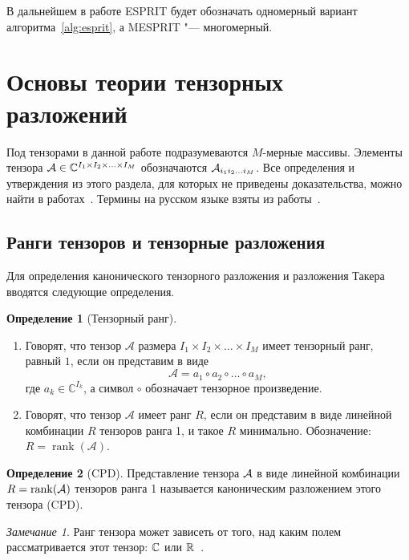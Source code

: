 \documentclass[specialist,
  substylefile = spbu.rtx,
subf,href,colorlinks=true, 12pt]{disser}
\theoremstyle{plain}
\theoremstyle{definition}
\newtheorem{definition}{Определение}[section]
\theoremstyle{remark}
\newtheorem{remark}{Замечание}[section]
\begin{document}
В дальнейшем в работе ESPRIT будет обозначать одномерный вариант
алгоритма~\ref{alg:esprit}, а MESPRIT "--- многомерный.

\section{Основы теории тензорных разложений}\label{sec:tensor-decompositions}
Под тензорами в данной работе подразумеваются $M$-мерные массивы.
Элементы тензора $\mathcal{A} \in \mathbb{C}^{I_1 \times I_2 \times \ldots \times
I_M}$ обозначаются
$\mathcal{A}_{i_1 i_2 \ldots i_M}$.
Все определения и утверждения из этого раздела, для которых не
приведены доказательства, можно найти в работах~\cite{hosvd,
Kilmer2011, Kilmer2013, tensor-bg, tensor-bg2, tensor-bg3}.
Термины на русском языке взяты из работы~\cite{tensor-rus}.

\subsection{Ранги тензоров и тензорные разложения}\label{subsec:tensor-ranks}
Для определения канонического тензорного разложения и разложения
Такера вводятся следующие определения.
\begin{definition}[Тензорный ранг]
  \leavevmode
  \begin{enumerate}
    \item Говорят, что тензор $\mathcal{A}$ размера $I_1\times
      I_2\times \ldots \times I_M$ имеет тензорный ранг, равный $1$,
      если он представим в виде
      \[
        \mathcal{A}=a_1\circ a_2\circ \ldots \circ a_M,
      \]
      где $a_{k} \in \mathbb{C}^{I_k}$, а символ $\circ$ обозначает
      тензорное произведение.
    \item Говорят, что тензор $\mathcal{A}$ имеет ранг $R$, если он
      представим в виде линейной комбинации $R$ тензоров
      ранга 1, и такое $R$ минимально.
      Обозначение: $R=\operatorname{rank}(\mathcal{A})$.
  \end{enumerate}
\end{definition}
\begin{definition}[CPD]
  Представление тензора $\mathcal{A}$ в виде линейной комбинации
  $R = \operatorname{rank}(\mathcal{A})$ тензоров ранга 1 называется
  каноническим разложением этого тензора (CPD).
\end{definition}

\begin{remark}
  Ранг тензора может зависеть от того, над каким полем
  рассматривается этот тензор:
  $\mathbb{C}$ или $\mathbb{R}$~\cite{tensor-bg}.
\end{remark}
\end{document}
